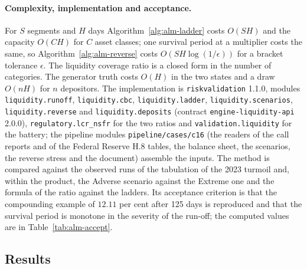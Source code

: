 \paragraph{Complexity, implementation and acceptance.}
{\sloppy For $S$ segments and $H$ days Algorithm~\ref{alg:alm-ladder} costs $O(SH)$ and the capacity $O(CH)$ for $C$ asset classes; one survival period at a multiplier costs the same, so Algorithm~\ref{alg:alm-reverse} costs $O(SH\log(1/\epsilon))$ for a bracket tolerance $\epsilon$. The liquidity coverage ratio is a closed form in the number of categories. The generator truth costs $O(H)$ in the two states and a draw $O(nH)$ for $n$ depositors. The implementation is \texttt{riskvalidation} 1.1.0, modules \texttt{liquidity.runoff}, \texttt{liquidity.cbc}, \texttt{liquidity.ladder}, \texttt{liquidity.scenarios}, \texttt{liquidity.reverse} and \texttt{liquidity.deposits} (contract \texttt{engine-liquidity-api} 2.0.0), \texttt{regulatory.lcr\_nsfr} for the two ratios and \texttt{validation.liquidity} for the battery; the pipeline modules \texttt{pipeline/cases/c16} (the readers of the call reports and of the Federal Reserve H.8 tables, the balance sheet, the scenarios, the reverse stress and the document) assemble the inputs. The method is compared against the observed runs of the tabulation of the 2023 turmoil and, within the product, the Adverse scenario against the Extreme one and the formula of the ratio against the ladders. Its acceptance criterion is that the compounding example of $12.11$ per cent after 125 days is reproduced and that the survival period is monotone in the severity of the run-off; the computed values are in Table~\ref{tab:alm-accept}.\par}

\subsection{Results}
\label{sec:results-alm}

